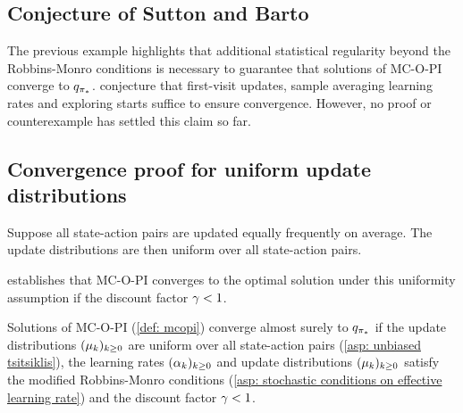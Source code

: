 \subsection{Conjecture of Sutton and Barto}

The previous example highlights that additional statistical
regularity beyond the Robbins-Monro conditions is necessary to guarantee that solutions of MC-O-PI converge to $q_{{\pi}_*}$.
\citet[p. 99]{Sutton2018ReinforcementIntroduction}
conjecture that first-visit updates, sample averaging learning rates and exploring starts
suffice to ensure convergence.
However, no proof or counterexample has settled this claim so far.

\subsection{Convergence proof for uniform update distributions}

\vspace{-0.1cm}

Suppose all state-action pairs are updated equally frequently on average. The update distributions are then uniform over all state-action pairs.

\vspace{-0.1cm}



\vspace{-0.7cm}

\cite{Tsitsiklis2002OnIteration} establishes that MC-O-PI converges to the optimal solution under this uniformity assumption if the discount factor $\gamma<1$.


\vspace{-0.1cm}

\begin{theorem}
\label{thm: tsitsiklis convergence proof}
Solutions of MC-O-PI (\autoref{def: mcopi}) converge almost surely to $q_{{\pi}_*}$
if the update distributions $(\mu_k)_{k \geq 0}$ are uniform over all state-action pairs (\autoref{asp: unbiased tsitsiklis}),
the learning rates $(\alpha_k)_{k \geq 0}$ and update distributions $(\mu_k)_{k \geq 0}$ satisfy the modified Robbins-Monro conditions (\autoref{asp: stochastic conditions on effective learning rate})
and the discount factor $\gamma < 1$.
\end{theorem}


